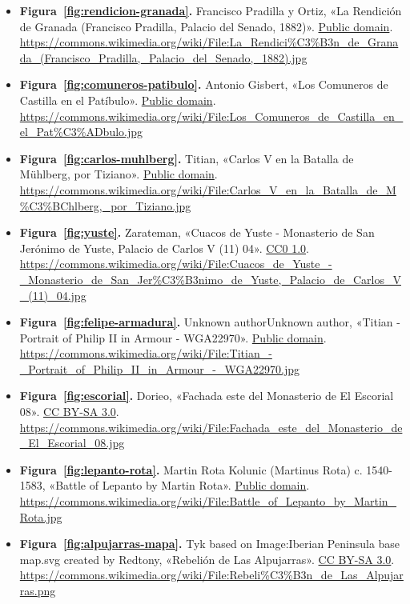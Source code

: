 \documentclass{book}
\begin{document}
\begin{itemize}
\item \textbf{Figura~\ref{fig:rendicion-granada}.} Francisco Pradilla y Ortiz, «La Rendición de Granada (Francisco Pradilla, Palacio del Senado, 1882)». \href{https://creativecommons.org/publicdomain/mark/1.0/}{Public domain}. \url{https://commons.wikimedia.org/wiki/File:La_Rendici%C3%B3n_de_Granada_(Francisco_Pradilla,_Palacio_del_Senado,_1882).jpg}
\item \textbf{Figura~\ref{fig:comuneros-patibulo}.} Antonio Gisbert, «Los Comuneros de Castilla en el Patíbulo». \href{https://creativecommons.org/publicdomain/mark/1.0/}{Public domain}. \url{https://commons.wikimedia.org/wiki/File:Los_Comuneros_de_Castilla_en_el_Pat%C3%ADbulo.jpg}
\item \textbf{Figura~\ref{fig:carlos-muhlberg}.} Titian, «Carlos V en la Batalla de Mühlberg, por Tiziano». \href{https://creativecommons.org/publicdomain/mark/1.0/}{Public domain}. \url{https://commons.wikimedia.org/wiki/File:Carlos_V_en_la_Batalla_de_M%C3%BChlberg,_por_Tiziano.jpg}
\item \textbf{Figura~\ref{fig:yuste}.} Zarateman, «Cuacos de Yuste - Monasterio de San Jerónimo de Yuste, Palacio de Carlos V (11) 04». \href{https://creativecommons.org/publicdomain/zero/1.0/}{CC0 1.0}. \url{https://commons.wikimedia.org/wiki/File:Cuacos_de_Yuste_-_Monasterio_de_San_Jer%C3%B3nimo_de_Yuste,_Palacio_de_Carlos_V_(11)_04.jpg}
\item \textbf{Figura~\ref{fig:felipe-armadura}.} Unknown authorUnknown author, «Titian - Portrait of Philip II in Armour - WGA22970». \href{https://creativecommons.org/publicdomain/mark/1.0/}{Public domain}. \url{https://commons.wikimedia.org/wiki/File:Titian_-_Portrait_of_Philip_II_in_Armour_-_WGA22970.jpg}
\item \textbf{Figura~\ref{fig:escorial}.} Dorieo, «Fachada este del Monasterio de El Escorial 08». \href{https://creativecommons.org/licenses/by-sa/3.0/}{CC BY-SA 3.0}. \url{https://commons.wikimedia.org/wiki/File:Fachada_este_del_Monasterio_de_El_Escorial_08.jpg}
\item \textbf{Figura~\ref{fig:lepanto-rota}.} Martin Rota Kolunic (Martinus Rota) c. 1540-1583, «Battle of Lepanto by Martin Rota». \href{https://creativecommons.org/publicdomain/mark/1.0/}{Public domain}. \url{https://commons.wikimedia.org/wiki/File:Battle_of_Lepanto_by_Martin_Rota.jpg}
\item \textbf{Figura~\ref{fig:alpujarras-mapa}.} Tyk based on Image:Iberian Peninsula base map.svg created by Redtony, «Rebelión de Las Alpujarras». \href{https://creativecommons.org/licenses/by-sa/3.0/}{CC BY-SA 3.0}. \url{https://commons.wikimedia.org/wiki/File:Rebeli%C3%B3n_de_Las_Alpujarras.png}

\end{itemize}
\end{document}
